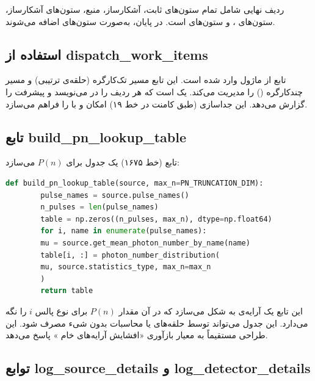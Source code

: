 ردیف نهایی  شامل تمام ستون‌های ثابت،  آشکارساز،  منبع، ستون‌های  آشکارساز، ستون‌های ، و ستون‌های  است. در پایان،  به‌صورت ستون‌های  اضافه می‌شوند.

\subsection{استفاده از dispatch\_work\_items}

تابع  از ماژول  وارد شده است. این تابع مسیر تک‌کارگره (حلقه‌ی  ترتیبی) و مسیر چندکارگره () را مدیریت می‌کند.  یک  است که هر ردیف را در  می‌نویسد و پیشرفت را گزارش می‌دهد. این جداسازی (طبق کامنت در خط ۱۹) امکان   و  با  را فراهم می‌سازد.

\subsection{تابع build\_pn\_lookup\_table}

تابع  (خط ۱۶۷۵) یک جدول  برای $P(n)$ می‌سازد:

\begin{LTR}
	\begin{lstlisting}[language=Python]
		def build_pn_lookup_table(source, max_n=PN_TRUNCATION_DIM):
		pulse_names = source.pulse_names()
		n_pulses = len(pulse_names)
		table = np.zeros((n_pulses, max_n), dtype=np.float64)
		for i, name in enumerate(pulse_names):
		mu = source.get_mean_photon_number_by_name(name)
		table[i, :] = photon_number_distribution(
		mu, source.statistics_type, max_n=max_n
		)
		return table
	\end{lstlisting}
\end{LTR}

این تابع یک آرایه‌ی  به شکل  می‌سازد که در آن  مقدار $P(n)$ برای نوع پالس $i$ را نگه می‌دارد. این جدول می‌تواند توسط حلقه‌های  یا محاسبات  بدون  شیء  مصرف شود. این طراحی مستقیماً به معیار بازآوری «افشایش آرایه‌های خام » پاسخ می‌دهد.

\subsection{توابع log\_source\_details و log\_detector\_details}

